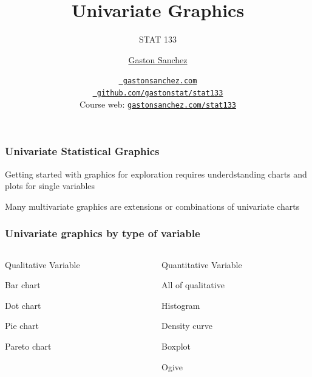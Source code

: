 \documentclass[12pt]{beamer}\usepackage[]{graphicx}\usepackage[]{color}
\title{Univariate Graphics}
\subtitle{STAT 133}
\author{\href{http://www.gastonsanchez.com}{Gaston Sanchez}}
\institute{Department of Statistics, UC{\textendash}Berkeley}
\date{\href{http://www.gastonsanchez.com}{\tt \scriptsize \color{foreground} gastonsanchez.com}
\\[-4pt]
\href{http://github.com/gastonstat/stat133}{\tt \scriptsize \color{foreground} github.com/gastonstat/stat133}
\\[-4pt]
{\scriptsize Course web: \href{http://www.gastonsanchez.com/stat133}{\tt gastonsanchez.com/stat133}}
}
\begin{document}
{
  \frame{
    \titlepage
  } 
}


\begin{frame}
\begin{center}
\Huge{}
\end{center}
\end{frame}


\begin{frame}
\frametitle{Univariate Statistical Graphics}
\begin{center}
\large{Getting started with graphics for exploration requires underdstanding charts and plots for single variables}
\pause

\bigskip
\large{Many multivariate graphics are extensions or combinations of univariate charts}

\end{center}
\end{frame}


\begin{frame}[fragile]
\frametitle{Univariate graphics by type of variable}

\begin{columns}[t]
\begin{column}{0.4\textwidth}
Qualitative Variable
\bi
  \item Bar chart
  \item Dot chart
  \item Pie chart
  \item Pareto chart
\ei
\end{column}

\begin{column}{0.5\textwidth}
Quantitative Variable
\bi
  \item All of qualitative
  \item Histogram
  \item Density curve
  \item Boxplot
  \item Ogive
\ei
\end{column}
\end{columns}

\end{frame}

\end{document}
